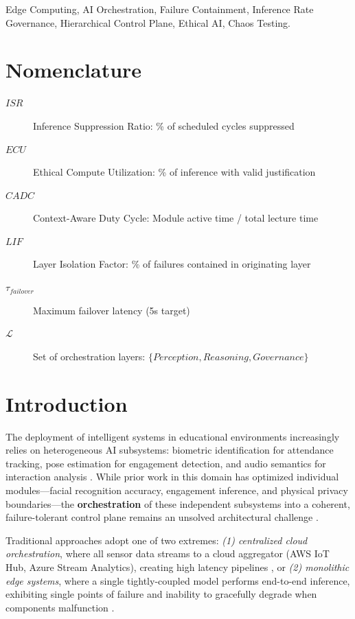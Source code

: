 \documentclass[conference]{IEEEtran}
\begin{document}
\begin{IEEEkeywords}
Edge Computing, AI Orchestration, Failure Containment, Inference Rate Governance, Hierarchical Control Plane, Ethical AI, Chaos Testing.
\end{IEEEkeywords}

\section*{Nomenclature}
\begin{description}
    \item[$ISR$] Inference Suppression Ratio: \% of scheduled cycles suppressed
    \item[$ECU$] Ethical Compute Utilization: \% of inference with valid justification
    \item[$CADC$] Context-Aware Duty Cycle: Module active time / total lecture time
    \item[$LIF$] Layer Isolation Factor: \% of failures contained in originating layer
    \item[$\tau_{failover}$] Maximum failover latency (5s target)
    \item[$\mathcal{L}$] Set of orchestration layers: $\{Perception, Reasoning, Governance\}$
\end{description}

\section{Introduction}

The deployment of intelligent systems in educational environments increasingly relies on heterogeneous AI subsystems: biometric identification for attendance tracking, pose estimation for engagement detection, and audio semantics for interaction analysis \cite{b19}. While prior work in this domain has optimized individual modules---facial recognition accuracy, engagement inference, and physical privacy boundaries---the \textbf{orchestration} of these independent subsystems into a coherent, failure-tolerant control plane remains an unsolved architectural challenge \cite{b14}.

Traditional approaches adopt one of two extremes: \textit{(1) centralized cloud orchestration}, where all sensor data streams to a cloud aggregator (AWS IoT Hub, Azure Stream Analytics), creating high latency pipelines \cite{b4, b15}, or \textit{(2) monolithic edge systems}, where a single tightly-coupled model performs end-to-end inference, exhibiting single points of failure and inability to gracefully degrade when components malfunction \cite{b5}.
\end{document}
